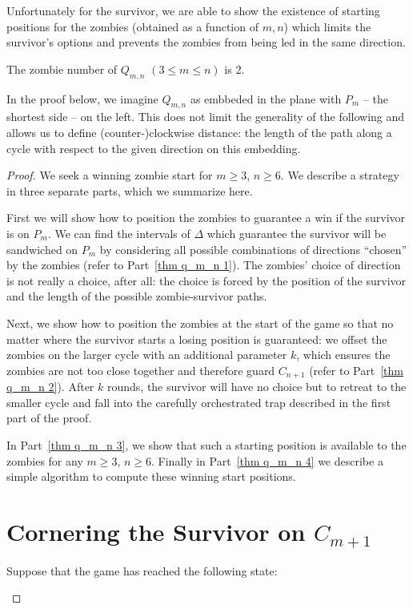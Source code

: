 Unfortunately for the survivor, we are able to show
the existence of starting positions for the zombies (obtained as a function of $m, n$) which
limits the survivor's options and prevents the zombies from being led in the same direction.

\begin{theorem}
 The zombie number of $Q_{m,n}$  $(3 \leq m \leq n)$ is 2.
\end{theorem}

In the proof below, we imagine $Q_{m,n}$ as embbeded in the plane with $P_m$
-- the shortest side -- on the left.
This does not limit the generality of the following and allows us to define
(counter-)clockwise distance: the length of the path
along a cycle with respect to the given direction on this embedding.

\begin{proof}
  We seek a winning zombie start for $m \geq 3$, $n \geq 6$.
  We describe a strategy in three separate parts, which we summarize here.

  First we will show how to position the zombies to guarantee a win if the survivor is on $P_m$.
  We can find the intervals of $\Delta$ which guarantee the survivor will be sandwiched on $P_m$ by  considering all possible combinations of directions ``chosen'' by the zombies (refer to Part~\ref{thm q_m_n 1}). The zombies' choice of direction is not really a choice, after all: the choice is forced by the position of the survivor and the length of the possible zombie-survivor paths.

  Next, we show how to position the zombies at the start of the game so that
  no matter where the survivor starts a losing position is guaranteed:
  we offset the zombies on the larger cycle with an additional parameter $k$, which ensures the zombies are not too close together and therefore guard $C_{n+1}$ (refer to Part~\ref{thm q_m_n 2}). After $k$ rounds, the survivor will have no choice but to retreat to the smaller cycle and fall into the carefully
  orchestrated trap described in the first part of the proof.

  In Part~\ref{thm q_m_n 3}, we show that such a starting position is available to the zombies
  for any $m \geq 3$, $n \geq 6$. Finally in Part~\ref{thm q_m_n 4} we describe a simple algorithm to compute these winning start positions.

  \section{Cornering the Survivor on $C_{m+1}$\label{thm q_m_n 1}}
\begin{proofpart}
   Suppose that the game has reached the following state:


\end{proofpart}
\end{proof}
